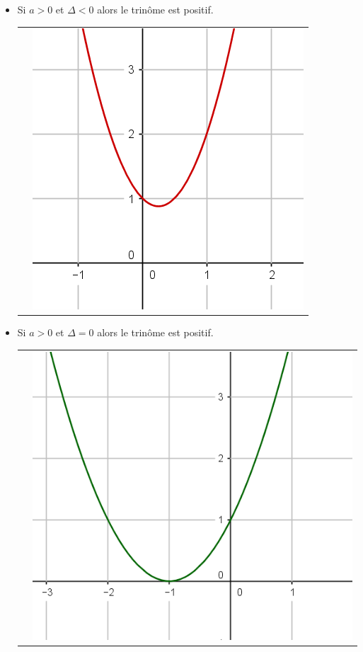 \documentclass[12pt,a4paper]{article}
\begin{document}
			\begin{itemize}
				\item 
				Si $a > 0$ et $\Delta < 0$ alors	le trinôme est positif.
				
				\begin{tabular}{ll }
					 &
					
					\includegraphics[scale=0.3]{./img/fig_5}\\
				\end{tabular}
					
					
				\item 
				Si $a > 0$ et $\Delta = 0$ alors le trinôme est positif.
				
				\begin{tabular}{ll }
					 &
					
					\includegraphics[scale=0.25]{./img/fig_1}\\
				\end{tabular}	
									

\end{itemize}
\end{document}
